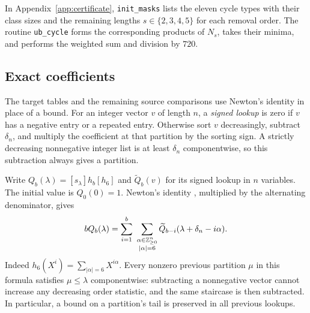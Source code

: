In Appendix~\ref{app:certificate}, \texttt{init\_masks} lists the eleven
cycle types with their class sizes and the remaining lengths
\(s\in\{2,3,4,5\}\) for each removal order. The routine
\texttt{ub\_cycle} forms the corresponding products of \(N_s\), takes
their minima, and performs the weighted sum and division by \(720\).

\subsection{Exact coefficients}
The target tables and the remaining source comparisons use Newton's
identity in place of a bound. For an integer vector \(v\) of length
\(n\), a \emph{signed lookup} is zero if \(v\) has a negative entry or a
repeated entry. Otherwise sort \(v\) decreasingly, subtract
\(\delta_n\), and multiply the coefficient at that partition by the
sorting sign. A strictly decreasing nonnegative integer list is at
least \(\delta_n\) componentwise, so this subtraction always gives a
partition.

Write \(Q_b(\lambda)=[s_\lambda]h_b[h_6]\) and
\(\widetilde Q_b(v)\) for its signed lookup in \(n\) variables.
The initial value is
\(Q_0(0)=1\). Newton's identity
\cite[Chapter~I, equation~(2.11)]{Macdonald1995}, multiplied by the alternating
denominator, gives
\begin{equation}\label{eq:targetrec}
 bQ_b(\lambda)=
 \sum_{i=1}^b\ \sum_{\substack{\alpha\in\mathbb Z_{\ge0}^n\\|\alpha|=6}}
       \widetilde Q_{b-i}(\lambda+\delta_n-i\alpha).
\end{equation}
Indeed \(h_6(X^i)=\sum_{|\alpha|=6}X^{i\alpha}\).
Every nonzero previous partition \(\mu\) in this formula satisfies
\(\mu\le\lambda\) componentwise: subtracting a nonnegative vector cannot
increase any decreasing order statistic, and the same staircase is then
subtracted. In particular, a bound on a partition's tail is preserved in
all previous lookups.

